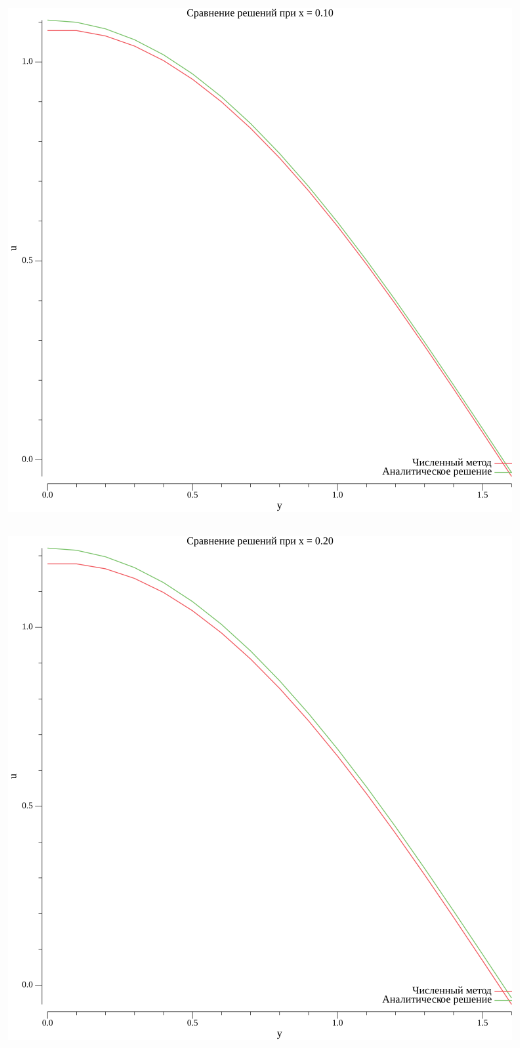 \documentclass{article}
\begin{document}
\\
\includegraphics[scale=0.6]{1plot_x_0.10.png}
\\

\\
\includegraphics[scale=0.6]{1plot_x_0.20.png}
\\
\end{document}
